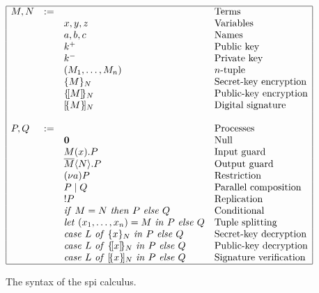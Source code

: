 \documentclass[10pt,a4paper,final,oneside,fleqn]{book}
\begin{document}
\begin{figure}[bht]
\begin{center}
$\begin{array}{|llll|}\hline
M,N&:=&&\mbox{Terms}\\
&&x,y,z&\mbox{Variables}\\
&&a,b,c&\mbox{Names}\\
&&k^+&\mbox{Public key}\\
&&k^-&\mbox{Private key}\\
&&(M_1,\ldots,M_n)&\mbox{$n$-tuple}\\
&&\{M\}_N&\mbox{Secret-key encryption}\\
&&\{\![M]\!\}_N&\mbox{Public-key encryption}\\ 
&&[\!\{M\}\!]_N&\mbox{Digital signature}\\&&&\\
P,Q&:=&&\mbox{Processes}\\
&&\textbf{0}&\mbox{Null}\\
&&M(x).P&\mbox{Input guard}\\
&&\overline{M}\langle N\rangle.P&\mbox{Output guard}\\
&&(\nu a)P&\mbox{Restriction}\\
&&P\mid Q&\mbox{Parallel composition}\\ 
&&!P&\mbox{Replication}\\
&&\mbox{{\itshape if\/} }M=N\mbox{ {\itshape then\/} }P\mbox{ {\itshape else\/} }Q&\mbox{Conditional}\\
&&\mbox{{\itshape let\/} }(x_1,\ldots,x_n)=M\mbox{ {\itshape in\/} }P\mbox{ {\itshape else\/} }Q&\mbox{Tuple splitting}\\
&&\mbox{{\itshape case\/} }L\mbox{ {\itshape of\/} }\{x\}_N\mbox{ {\itshape in\/} }P\mbox{ {\itshape else\/} }Q&\mbox{Secret-key decryption}\\
&&\mbox{{\itshape case\/} }L\mbox{ {\itshape of\/} }\{\![x]\!\}_N\mbox{ {\itshape in\/} }P\mbox{ {\itshape else\/} }Q&\mbox{Public-key decryption}\\ &&\mbox{{\itshape case\/} }L\mbox{ {\itshape of\/} }[\!\{x\}\!]_N\mbox{ {\itshape in\/} }P\mbox{ {\itshape else\/} }Q&\mbox{Signature verification}\\
\hline
\end{array}$
\end{center}
\caption{The syntax of the spi calculus.\label{syntaxspi}}
\end{figure}
\end{document}
